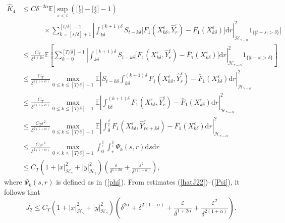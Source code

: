 \documentclass[10pt,a4paper]{article}
\numberwithin{equation}{section}
\begin{document}
\begin{align}\label{Psi}
\hat{K}_4
	&\leq C \delta^{-2\alpha}\mathbb E\Bigg[\sup_{s<t} \left(\Big [\frac t\delta \Big]-\Big [\frac s\delta \Big ]-1 \right) \nonumber\\
	&~~~~~~~~~~~~~~\times \sum_{k=[s/\delta]+1}^{[t/\delta]-1} \left|  \int_{k\delta}^{(k+1)\delta} S_{t-k\delta} \big[F_1(X_{k\delta}^\varepsilon,\hat{Y}_r^\varepsilon)-\bar{F}_1(X_{k\delta}^\varepsilon) \big]\mathrm{d} r \right|_{\mathcal H_{\gamma-\alpha} }^2 1_{ \{|t-s|>\delta \}} \Bigg ] \nonumber\\
	&\leq  \frac {C_T}{\delta^{1+2\alpha}} \mathbb E \left [\sum_{k=0}^{[T/\delta]-1} \left|  \int_{k\delta}^{(k+1)\delta} S_{t-k\delta} \big [F_1(X_{k\delta}^\varepsilon,\hat{Y}_r^\varepsilon)-\bar{F}_1(X_{k\delta}^\varepsilon) \big]\mathrm{d} r \right|_{\mathcal H_{\gamma-\alpha} }^2 1_{ \{|t-s|>\delta \}} \right ] \nonumber\\
	&\leq \frac {C_T}{\delta^{2(1+\alpha)}} \max_{0\leq k\leq[T/\delta]-1}\mathbb E \left| S_{t-k\delta} \int_{k\delta}^{(k+1)\delta}  F_1(X_{k\delta}^\varepsilon,\hat{Y}_r^\varepsilon)-\bar{F}_1(X_{k\delta}^\varepsilon)  \mathrm{d} r \right|_{\mathcal H_{\gamma-\alpha} }^2  \nonumber\\
	&\leq \frac {C_T}{\delta^{2(1+\alpha)}} \max_{0\leq k\leq[T/\delta]-1}\mathbb E\left| \int_{k\delta}^{(k+1)\delta} F_1(X_{k\delta}^\varepsilon,\hat{Y}_r^\varepsilon)-\bar{F}_1(X_{k\delta}^\varepsilon)  \mathrm{d} r \right|_{\mathcal H_{\gamma-\alpha} }^2 \nonumber\\
	&\leq \frac {C_T\varepsilon^2}{\delta^{2(1+\alpha)}} \max_{0\leq k\leq[T/\delta]-1}
	\mathbb E \left|\int_0^{\frac \delta\varepsilon} F_1(X_{k\delta}^\varepsilon,\hat{Y}_{r\varepsilon+k\delta}^\varepsilon)-\bar{F}_1(X_{k\delta}^\varepsilon) \mathrm{d} r \right|_{\mathcal H_{\gamma-\alpha} }^2  \nonumber\\
	&\leq \frac {C_T\varepsilon^2}{\delta^{2(1+\alpha)}} \max_{0\leq k\leq[T/\delta]-1}
	\int_0^{\frac \delta\varepsilon}\int_r^{\frac \delta\varepsilon}\Psi_k(s,r) \mathrm{d} s \mathrm{d} r \nonumber\\
& \leq C_T (1+|x|_{\mathcal H_\gamma}^2+| y |_{\mathcal H_\gamma }^2) \left(\frac {\varepsilon} {\delta^{1+2\alpha}} +\frac {\varepsilon^2} {\delta^{2(1+\alpha)}}  \right),
\end{align}
where $\Psi_k(s,r)$ is defined as in (\ref{phi}). From estimates (\ref{hatJ22})--(\ref{Psi}), it follows that
\begin{equation}\label{hatJ2}
\hat{J}_2\leq C_T(1+|x|_{\mathcal H_\gamma}^2+| y |_{\mathcal H_\gamma }^2) \left(\delta^{2\alpha}+\delta^{2(1-\alpha)}+\frac {\varepsilon} {\delta^{1+2\alpha}} +\frac {\varepsilon^2} {\delta^{2(1+\alpha)}}  \right).
\end{equation}
\end{document}
